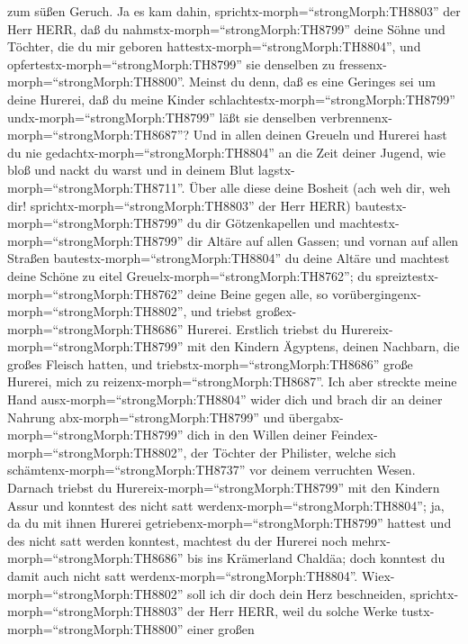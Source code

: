zum süßen Geruch. Ja es kam dahin, sprichtx-morph=``strongMorph:TH8803''
der Herr HERR,  daß du nahmstx-morph=``strongMorph:TH8799''
deine Söhne und Töchter, die du mir geboren
hattestx-morph=``strongMorph:TH8804'', und
opfertestx-morph=``strongMorph:TH8799'' sie denselben zu
fressenx-morph=``strongMorph:TH8800''. Meinst du denn, daß es eine
Geringes sei um deine Hurerei,  daß du meine Kinder
schlachtestx-morph=``strongMorph:TH8799''
undx-morph=``strongMorph:TH8799'' läßt sie denselben
verbrennenx-morph=``strongMorph:TH8687''?  Und in allen
deinen Greueln und Hurerei hast du nie
gedachtx-morph=``strongMorph:TH8804'' an die Zeit deiner Jugend, wie
bloß und nackt du warst und in deinem Blut
lagstx-morph=``strongMorph:TH8711''.  Über alle diese deine
Bosheit (ach weh dir, weh dir! sprichtx-morph=``strongMorph:TH8803'' der
Herr HERR)  bautestx-morph=``strongMorph:TH8799'' du dir
Götzenkapellen und machtestx-morph=``strongMorph:TH8799'' dir Altäre auf
allen Gassen;  und vornan auf allen Straßen
bautestx-morph=``strongMorph:TH8804'' du deine Altäre und machtest deine
Schöne zu eitel Greuelx-morph=``strongMorph:TH8762''; du
spreiztestx-morph=``strongMorph:TH8762'' deine Beine gegen alle, so
vorübergingenx-morph=``strongMorph:TH8802'', und triebst
großex-morph=``strongMorph:TH8686'' Hurerei.  Erstlich
triebst du Hurereix-morph=``strongMorph:TH8799'' mit den Kindern
Ägyptens, deinen Nachbarn, die großes Fleisch hatten, und
triebstx-morph=``strongMorph:TH8686'' große Hurerei, mich zu
reizenx-morph=``strongMorph:TH8687''.  Ich aber streckte
meine Hand ausx-morph=``strongMorph:TH8804'' wider dich und brach dir an
deiner Nahrung abx-morph=``strongMorph:TH8799'' und
übergabx-morph=``strongMorph:TH8799'' dich in den Willen deiner
Feindex-morph=``strongMorph:TH8802'', der Töchter der Philister, welche
sich schämtenx-morph=``strongMorph:TH8737'' vor deinem verruchten Wesen.
 Darnach triebst du Hurereix-morph=``strongMorph:TH8799''
mit den Kindern Assur und konntest des nicht satt
werdenx-morph=``strongMorph:TH8804''; ja, da du mit ihnen Hurerei
getriebenx-morph=``strongMorph:TH8799'' hattest und des nicht satt
werden konntest,  machtest du der Hurerei noch
mehrx-morph=``strongMorph:TH8686'' bis ins Krämerland Chaldäa; doch
konntest du damit auch nicht satt werdenx-morph=``strongMorph:TH8804''.
 Wiex-morph=``strongMorph:TH8802'' soll ich dir doch dein
Herz beschneiden, sprichtx-morph=``strongMorph:TH8803'' der Herr HERR,
weil du solche Werke tustx-morph=``strongMorph:TH8800'' einer großen
